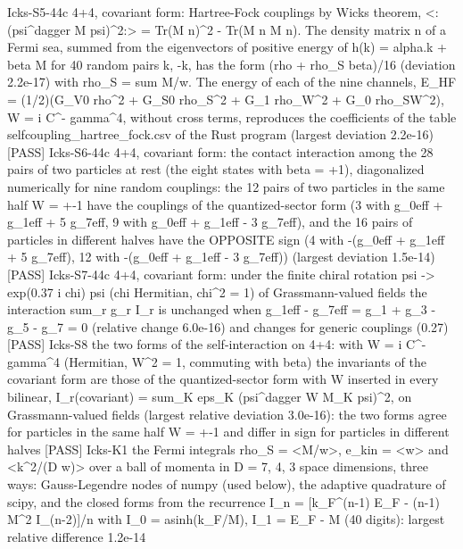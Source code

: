 \documentclass[
  10pt,
]{article}
\newenvironment{Shaded}{}{}
\newcommand{\NormalTok}[1]{#1}
\begin{document}
\begin{Shaded}
\begin{Highlighting}[]
\NormalTok{[PASS] Icks{-}S5{-}44c  4+4, covariant form: Hartree{-}Fock couplings by Wick\textquotesingle{}s theorem, \textless{}:(psi\^{}dagger M psi)\^{}2:\textgreater{} = Tr(M n)\^{}2 {-} Tr(M n M n). The density matrix n of a Fermi sea, summed from the eigenvectors of positive energy of h(k) = alpha.k + beta M for 40 random pairs k, {-}k, has the form (rho + rho\_S beta)/16 (deviation 2.2e{-}17) with rho\_S = sum M/w. The energy of each of the nine channels, E\_HF = (1/2)(G\_V0 rho\^{}2 + G\_S0 rho\_S\^{}2 + G\_1 rho\_W\^{}2 + G\_0 rho\_SW\^{}2), W = i C\^{}{-} gamma\^{}4, without cross terms, reproduces the coefficients of the table selfcoupling\_hartree\_fock.csv of the Rust program (largest deviation 2.2e{-}16)}
\NormalTok{[PASS] Icks{-}S6{-}44c  4+4, covariant form: the contact interaction among the 28 pairs of two particles at rest (the eight states with beta = +1), diagonalized numerically for nine random couplings: the 12 pairs of two particles in the same half W = +{-}1 have the couplings of the quantized{-}sector form (3 with g\_0eff + g\_1eff + 5 g\_7eff, 9 with g\_0eff + g\_1eff {-} 3 g\_7eff), and the 16 pairs of particles in different halves have the OPPOSITE sign (4 with {-}(g\_0eff + g\_1eff + 5 g\_7eff), 12 with {-}(g\_0eff + g\_1eff {-} 3 g\_7eff)) (largest deviation 1.5e{-}14)}
\NormalTok{[PASS] Icks{-}S7{-}44c  4+4, covariant form: under the finite chiral rotation psi {-}\textgreater{} exp(0.37 i chi) psi (chi Hermitian, chi\^{}2 = 1) of Grassmann{-}valued fields the interaction sum\_r g\_r I\_r is unchanged when g\_1eff {-} g\_7eff = g\_1 + g\_3 {-} g\_5 {-} g\_7 = 0 (relative change 6.0e{-}16) and changes for generic couplings (0.27)}
\NormalTok{[PASS] Icks{-}S8  the two forms of the self{-}interaction on 4+4: with W = i C\^{}{-} gamma\^{}4 (Hermitian, W\^{}2 = 1, commuting with beta) the invariants of the covariant form are those of the quantized{-}sector form with W inserted in every bilinear, I\_r(covariant) = sum\_K eps\_K (psi\^{}dagger W M\_K psi)\^{}2, on Grassmann{-}valued fields (largest relative deviation 3.0e{-}16): the two forms agree for particles in the same half W = +{-}1 and differ in sign for particles in different halves}
\NormalTok{[PASS] Icks{-}K1  the Fermi integrals rho\_S = \textless{}M/w\textgreater{}, e\_kin = \textless{}w\textgreater{} and \textless{}k\^{}2/(D w)\textgreater{} over a ball of momenta in D = 7, 4, 3 space dimensions, three ways: Gauss{-}Legendre nodes of numpy (used below), the adaptive quadrature of scipy, and the closed forms from the recurrence I\_n = [k\_F\^{}(n{-}1) E\_F {-} (n{-}1) M\^{}2 I\_(n{-}2)]/n with I\_0 = asinh(k\_F/M), I\_1 = E\_F {-} M (40 digits): largest relative difference 1.2e{-}14}

\end{Highlighting}
\end{Shaded}
\end{document}
